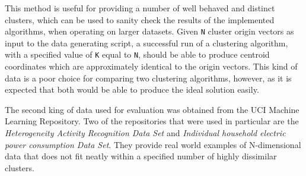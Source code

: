 \documentclass{l4proj}
\begin{document}
This method is useful for providing a number of well behaved and distinct clusters, which can be used to sanity check the results of the implemented algorithms, when operating on larger datasets. Given \texttt{N} cluster origin vectors as input to the data generating script, a successful run of a clustering algorithm, with a specified value of \texttt{K} equal to \texttt{N}, should be able to produce centroid coordinates which are approximately identical to the origin vectors. This kind of data is a poor choice for comparing two clustering algorithms, however, as it is expected that both would be able to produce the ideal solution easily.

The second king of data used for evaluation was obtained from the UCI Machine Learning Repository\cite{UCI}. Two of the repositories that were used in particular are the \textit{Heterogeneity Activity Recognition Data Set}\cite{HARDS} and \textit{Individual household electric power consumption Data Set}\cite{IHE}. They provide real world examples of N-dimensional data that does not fit neatly within a specified number of highly dissimilar clusters.
\end{document}
